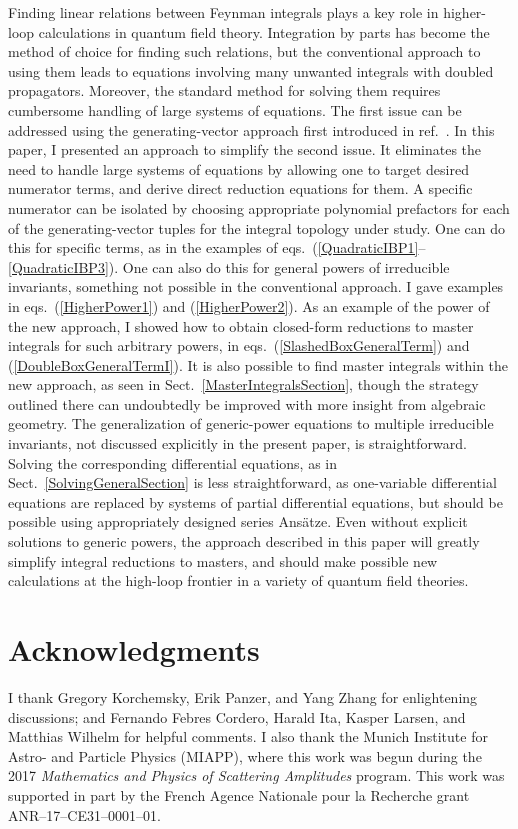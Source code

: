 \documentclass[aps,prd,preprint,groupedaddress,nofootinbib,showpacs,eqsecnum]{revtex4}
\def\sect#1{Sect.~{\ref{#1}}}
\def\eqns#1#2{eqs.~(\ref{#1}) and (\ref{#2})}
\def\eqnsR#1#2{eqs.~(\ref{#1}--\ref{#2})}
\begin{document}
Finding linear relations between Feynman integrals plays a key role
in higher-loop calculations in quantum field theory.  
Integration by parts has become the method of choice for finding
such relations, but the conventional approach to using them leads to 
equations involving many unwanted integrals with doubled propagators.
Moreover, the standard method for solving them requires cumbersome
handling of large systems of equations.
The first issue can be addressed using the generating-vector approach
first introduced in ref.~\cite{IBPGeneratingVectors}.
In this paper,
I presented an approach to simplify the second issue.  It eliminates
the need to handle large systems of equations by allowing one to target
desired numerator terms, and derive direct reduction equations for them.
A specific numerator can be isolated by choosing appropriate polynomial
prefactors for each of the generating-vector tuples for the integral
topology under study.  One can do this for specific terms, as 
in the examples of \eqnsR{QuadraticIBP1}{QuadraticIBP3}.  One can also do 
this for general
powers of irreducible invariants, something not possible in the
conventional approach.  I gave examples in \eqns{HigherPower1}{HigherPower2}.  
As an example of the power of the new approach, I showed how to obtain
closed-form reductions to master integrals for such arbitrary powers,
in \eqns{SlashedBoxGeneralTerm}{DoubleBoxGeneralTermI}.  It is also possible 
to find master integrals within
the new approach, as seen in \sect{MasterIntegralsSection}, though
the strategy outlined there can undoubtedly be improved with more
insight from algebraic geometry.  The generalization of generic-power
equations to multiple irreducible invariants, not discussed explicitly
in the present paper, is straightforward.  Solving the corresponding
differential equations, as in \sect{SolvingGeneralSection} is
less straightforward, as one-variable differential equations are replaced
by systems of partial differential equations, but should be possible
using appropriately designed series Ans\"atze.  Even without explicit
solutions to generic powers, 
the approach described in this paper will greatly simplify
integral reductions to masters, and should make possible new calculations
at the high-loop frontier in a variety of quantum field theories.


\section*{Acknowledgments}
I thank Gregory Korchemsky,
Erik Panzer, and Yang Zhang for enlightening discussions;
and Fernando Febres Cordero, Harald Ita, Kasper Larsen, and Matthias Wilhelm
for helpful comments.
I also thank the Munich Institute for Astro- and Particle Physics (MIAPP),
where this work was begun during the 2017 \textsl{Mathematics and
	Physics of Scattering Amplitudes\/} program.
 This work was supported in part by the French Agence Nationale pour la
 Recherche grant ANR--17--CE31--0001--01.
 
\end{document}

